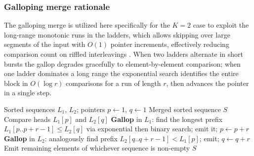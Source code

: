\documentclass[12pt,a4paper]{article}
\theoremstyle{plain}
\theoremstyle{definition}
\begin{document}
\subsubsection{Galloping merge rationale}
The galloping merge is utilized here specifically for the $K=2$ case to
exploit the long-range monotonic runs in the ladders, which allows skipping
over large segments of the input with $O(1)$ pointer increments, effectively
reducing comparison count on riffled interleavings \cite{Ghasemi2024}.  When two ladders
alternate in short bursts the gallop degrades gracefully to element-by-element
comparison; when one ladder dominates a long range the exponential search
identifies the entire block in $O(\log r)$ comparisons for a run of length
$r$, then advances the pointer in a single step.
\begin{algorithm}[H]
\caption{\textsc{TwoWayGalloping}$(L_1, L_2)$}
\label{alg:gallop}
\begin{algorithmic}[1]
\Require Sorted sequences $L_1$, $L_2$; pointers $p \gets 1$, $q \gets 1$
\Ensure Merged sorted sequence $S$
    \State Compare heads $L_1[p]$ and $L_2[q]$
        \State \textbf{Gallop} in $L_1$: find the longest prefix $L_1[p..p+r-1] \le L_2[q]$ via exponential then binary search; emit it; $p \gets p + r$
    \Else
        \State \textbf{Gallop} in $L_2$: analogously find prefix $L_2[q..q+r-1] < L_1[p]$; emit; $q \gets q + r$
    \EndIf
\EndWhile
\State Emit remaining elements of whichever sequence is non-empty
\State \Return $S$
\end{algorithmic}
\end{algorithm}
\end{document}
